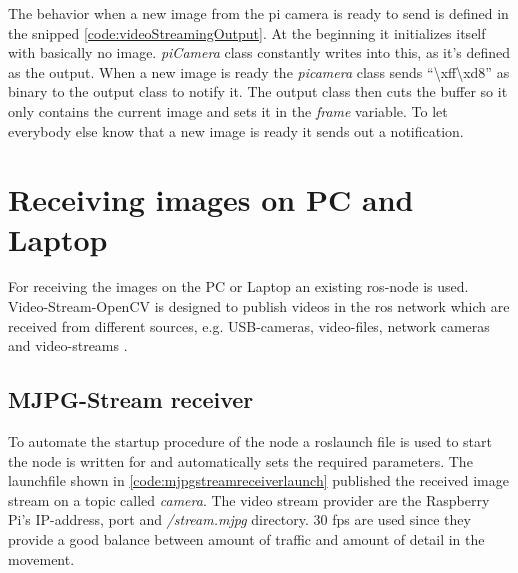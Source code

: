 The behavior when a new image from the pi camera is ready to send is defined in the snipped \ref{code:videoStreamingOutput}. At the beginning it initializes itself with basically no image. \textit{piCamera} class constantly writes into this, as it's defined as the output. When a new image is ready the \textit{picamera} class sends \enquote{\textbackslash xff\textbackslash xd8} as binary to the output class to notify it. The output class then cuts the buffer so it only contains the current image and sets it in the \textit{frame} variable. To let everybody else know that a new image is ready it sends out a notification.\newline



\section{Receiving images on PC and Laptop\authorA}
For receiving the images on the PC or Laptop an existing \gls{ros}-node is used. Video-Stream-OpenCV is designed to publish videos in the \gls{ros} network which are received from different sources, e.g. USB-cameras, video-files, network cameras and video-streams \cite{videostreamopencv}.

\subsection{MJPG-Stream receiver}
To automate the startup procedure of the node a roslaunch file is used to start the node is written for and automatically sets the required parameters.\newline
The launchfile shown in \ref{code:mjpgstreamreceiverlaunch} published the received image stream on a topic called \textit{camera}. The video stream provider are the Raspberry Pi's IP-address, port and \textit{/stream.mjpg} directory. 30 \gls{fps} are used since they provide a good balance between amount of traffic and amount of detail in the movement.\newline



